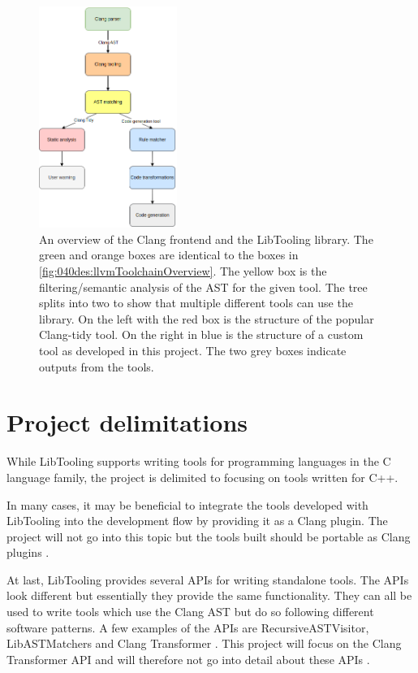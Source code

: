 \begin{figure}[H]
    \centering
    \includegraphics[width=0.4\textwidth]{figs/040des/clang_tool_pipeline.png}
    \caption{An overview of the Clang frontend and the LibTooling library. The green and orange boxes are identical to the boxes in \cref{fig:040des:llvmToolchainOverview}. The yellow box is the filtering/semantic analysis of the AST for the given tool. The tree splits into two to show that multiple different tools can use the library. On the left with the red box is the structure of the popular Clang-tidy tool\cite{clangClangTidyExtraClang}. On the right in blue is the structure of a custom tool as developed in this project. The two grey boxes indicate outputs from the tools.}
    \label{fig:040des:clangToolingOverview}
\end{figure}


\section{Project delimitations}
While LibTooling supports writing tools for programming languages in the C language family, the project is delimited to focusing on tools written for C++.

In many cases, it may be beneficial to integrate the tools developed with LibTooling into the development flow by providing it as a Clang plugin. The project will not go into this topic but the tools built should be portable as Clang plugins \cite{clangClangPluginsClang}.

At last, LibTooling provides several APIs for writing standalone tools. The APIs look different but essentially they provide the same functionality. They can all be used to write tools which use the Clang AST but do so following different software patterns. A few examples of the APIs are RecursiveASTVisitor, LibASTMatchers and Clang Transformer \cite{clangHowWriteRecursiveASTVisitor,clangWelcomeClangDocumentation}. This project will focus on the Clang Transformer API and will therefore not go into detail about these APIs \cite{clangClangTransformerTutorial}.